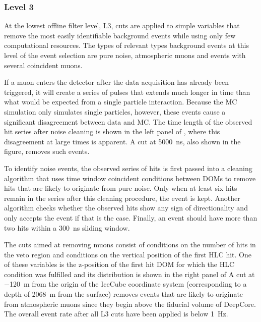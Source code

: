 \subsubsection{Level 3}
At the lowest offline filter level, L3, cuts are applied to simple variables that remove the most easily identifiable background events while using only few computational resources.
The types of relevant types background events at this level of the event selection are pure noise, atmospheric muons and events with several coincident muons.

If a muon enters the detector after the data acquisition has already been triggered, it will create a series of pulses that extends much longer in time than what would be expected from a single particle interaction.
Because the MC simulation only simulates single particles, however, these events cause a significant disagreement between data and MC.
The time length of the observed hit series after noise cleaning is shown in the left panel of , where this disagreement at large times is apparent.
A cut at \SI{5000}{\nano\second}, also shown in the figure, removes such events.

To identify noise events, the observed series of hits is first passed into a cleaning algorithm that uses time window coincident conditions between DOMs to remove hits that are likely to originate from pure noise.
Only when at least six hits remain in the series after this cleaning procedure, the event is kept.
Another algorithm checks whether the observed hits show any sign of directionality and only accepts the event if that is the case.
Finally, an event should have more than two hits within a \SI{300}{\nano\second} sliding window.

The cuts aimed at removing muons consist of conditions on the number of hits in the veto region and conditions on the vertical position of the first HLC hit.
One of these variables is the z-position of the first hit DOM for which the HLC condition was fulfilled and its distribution is shown in the right panel of 
A cut at \SI{-120}{\metre} from the origin of the IceCube coordinate system (corresponding to a depth of \SI{2068}{\metre} from the surface) removes events that are likely to originate from atmospheric muons since they begin above the fiducial volume of DeepCore.
The overall event rate after all L3 cuts have been applied is below \SI{1}{\hertz}.

